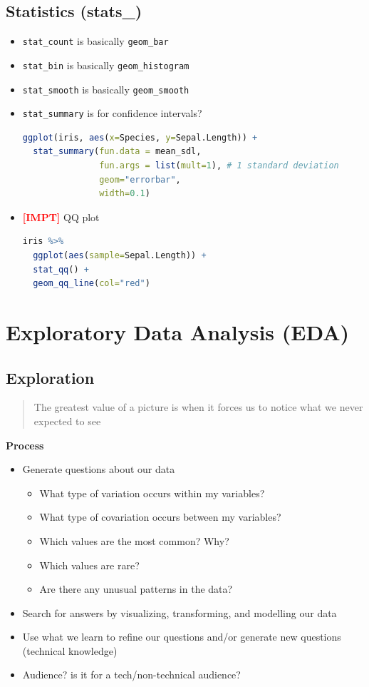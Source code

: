 \documentclass{article}
\newcommand{\impt}[0]{\textcolor{red}{\textbf{[IMPT] }}}
\begin{document}
\begin{multicols}{2}
\subsection{Statistics (stats\_)}
\begin{itemize}
	\item \texttt{stat\_count} is basically \texttt{geom\_bar}
	\item \texttt{stat\_bin} is basically \texttt{geom\_histogram}
	\item \texttt{stat\_smooth} is basically \texttt{geom\_smooth}
	\item \texttt{stat\_summary} is for confidence intervals?
	\begin{lstlisting}[language=R]
ggplot(iris, aes(x=Species, y=Sepal.Length)) +
  stat_summary(fun.data = mean_sdl,
               fun.args = list(mult=1), # 1 standard deviation
               geom="errorbar",
               width=0.1)
	\end{lstlisting}
    \item \impt QQ plot
    \begin{lstlisting}[language=R]
iris %>%
  ggplot(aes(sample=Sepal.Length)) +
  stat_qq() +
  geom_qq_line(col="red")
\end{lstlisting}
\end{itemize}

\section{Exploratory Data Analysis (EDA)}
\subsection{Exploration}
\begin{quote}
	The greatest value of a picture is when it forces us to notice what we never expected to see
\end{quote}
\textbf{Process}
\begin{itemize}
	\item Generate questions about our data
	\begin{itemize}
		\item What type of variation occurs within my variables?
		\item What type of covariation occurs between my variables?
		\item Which values are the most common? Why?
		\item Which values are rare?
		\item Are there any unusual patterns in the data?
	\end{itemize}
	\item Search for answers by visualizing, transforming, and modelling our data
	\item Use what we learn to refine our questions and/or generate new questions (technical knowledge)
	\item Audience? is it for a tech/non-technical audience?
\end{itemize}


\end{multicols}
\end{document}
